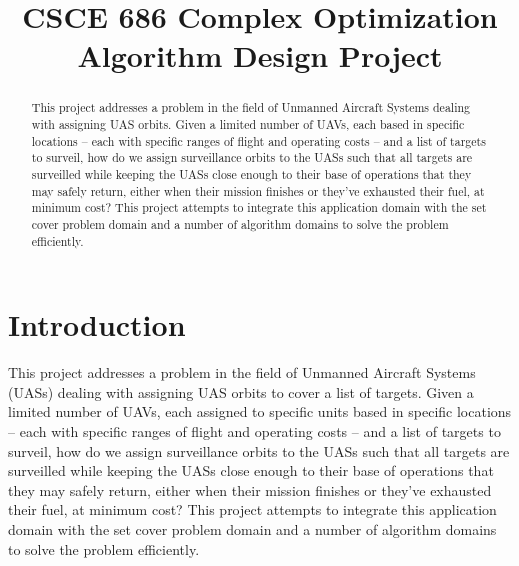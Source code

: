\documentclass[conference]{IEEEtran}
\begin{document}
 \title{CSCE 686 Complex Optimization\\Algorithm Design Project}

\author{
        }
\maketitle

\begin{abstract}

This project addresses a problem in the field of Unmanned Aircraft Systems
  dealing with assigning UAS orbits.  Given a limited number of UAVs, each
  based in specific locations -- each with specific ranges of flight and
  operating costs -- and a list of targets to surveil, how do we assign
  surveillance orbits to the UASs such that all targets are surveilled while
  keeping the UASs close enough to their base of operations that they may
  safely return, either when their mission finishes or they've exhausted their
  fuel, at minimum cost? This project attempts to integrate this application
  domain with the set cover problem domain and a number of algorithm domains to
  solve the problem efficiently.

\end{abstract}

\section{Introduction} \label{intro}


This project addresses a problem in the field of Unmanned Aircraft Systems
(UASs) dealing with assigning UAS orbits to cover a list of targets.  Given a
limited number of UAVs, each assigned to specific units based in specific
locations -- each with specific ranges of flight and operating costs -- and a
list of targets to surveil, how do we assign surveillance orbits to the UASs
such that all targets are surveilled while keeping the UASs close enough to
their base of operations that they may safely return, either when their mission
finishes or they've exhausted their fuel, at minimum cost? This project
attempts to integrate this application domain with the set cover problem domain
and a number of algorithm domains to solve the problem efficiently.
\end{document}
